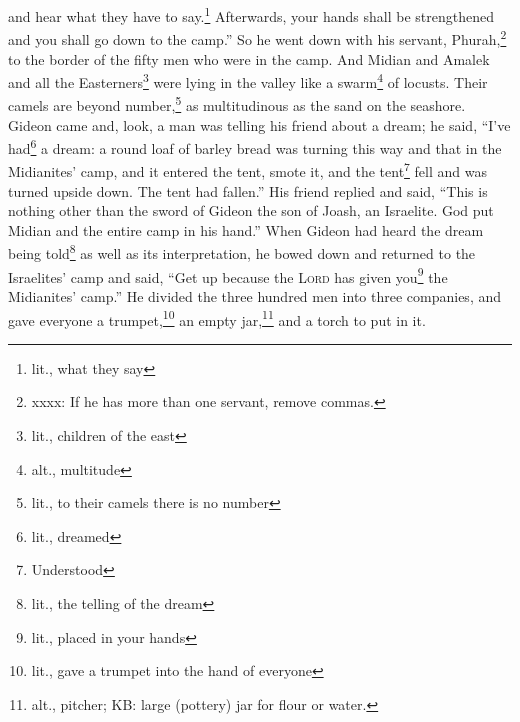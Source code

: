 \begin{inparaenum}
     and hear what they have to say.\footnote{lit., what they say} Afterwards, your hands shall be strengthened and you shall go down to the camp.'' So he went down with his servant, Phurah,\footnote{xxxx: If he has more than one servant, remove commas.} to the border of the fifty men who were in the camp.%
     And Midian and Amalek and all the Easterners\footnote{lit., children of the east} were lying in the valley like a swarm\footnote{alt., multitude} of locusts. Their camels are beyond number,\footnote{lit., to their camels there is no number} as multitudinous as the sand on the seashore.%
     Gideon came and, look, a man was telling his friend about a dream; he said, ``I've had\footnote{lit., dreamed} a dream: a round loaf of barley bread was turning this way and that in the Midianites' camp, and it entered the tent, smote it, and the tent\footnote{Understood} fell and was turned upside down. The tent had fallen.''%
     His friend replied and said, ``This is nothing other than the sword of Gideon the son of Joash, an Israelite. God put Midian and the entire camp in his hand.''%
     When Gideon had heard the dream being told\footnote{lit., the telling of the dream} as well as its interpretation, he bowed down and returned to the Israelites' camp and said, ``Get up because the \textsc{Lord} has given you\footnote{lit., placed in your hands} the Midianites' camp.''%
     He divided the three hundred men into three companies, and gave everyone a trumpet,\footnote{lit., gave a trumpet into the hand of everyone} an empty jar,\footnote{alt., pitcher; KB: large (pottery) jar for flour or water.} and a torch to put in it.%
\end{inparaenum}
